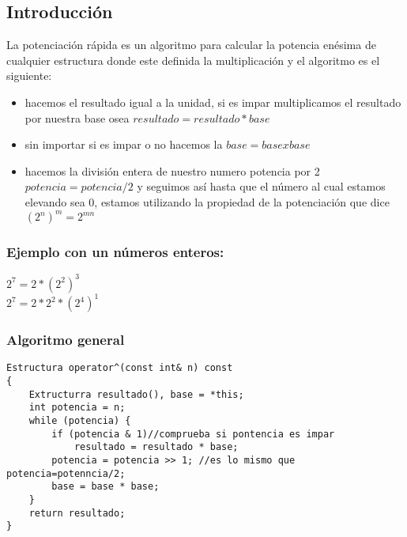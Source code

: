 \subsection{Introducción}
La potenciación rápida es un algoritmo para calcular la potencia enésima de cualquier estructura donde este definida la multiplicación y el algoritmo es el siguiente:
\begin{itemize}
\item hacemos el resultado igual a la unidad, si es impar multiplicamos el resultado por nuestra base  osea $resultado = resultado * base$
\item sin importar si es impar o no hacemos la $base =  base x base$
\item hacemos la división entera de nuestro numero  potencia por 2 $potencia=potencia/2$  y seguimos así hasta que el  número al cual estamos elevando sea 0, estamos utilizando la propiedad de la potenciación que dice $\left ( 2^{n} \right )^m=2^{mn}$
\end{itemize}

\subsubsection{Ejemplo con un números enteros:}

$2^{7} = 2* \left ( 2^{2}\right )^{3}$
\\$2^{7} = 2*2^{2} *\left (2^{4} \right )^{1}$

\subsubsection{Algoritmo general}
\begin{minipage}{\textwidth}
\begin{lstlisting}[style=C,caption=operadorPotencia]
Estructura operator^(const int& n) const
{
    Extructurra resultado(), base = *this;
    int potencia = n;
    while (potencia) {
        if (potencia & 1)//comprueba si pontencia es impar
            resultado = resultado * base;
        potencia = potencia >> 1; //es lo mismo que potencia=potenncia/2;
        base = base * base;
    }
    return resultado;
}
\end{lstlisting}
\end{minipage}
